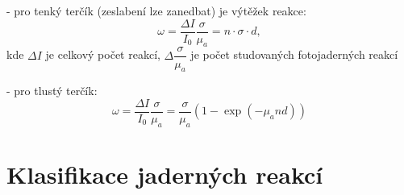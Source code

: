\documentclass[../../main.tex]{subfiles}
\begin{document}
- pro tenký terčík (zeslabení lze zanedbat) je výtěžek reakce:
\begin{equation}
\omega = \dfrac{\Delta I}{I_0} \dfrac{\sigma}{\mu _a} = n \cdotp \sigma \cdotp d,
\end{equation}
kde $\Delta I$ je celkový počet reakcí, $\Delta \dfrac{\sigma}{\mu_a}$ je počet studovaných fotojaderných reakcí

- pro tlustý terčík: 
\begin{equation}
\omega = \dfrac{\Delta I}{I_0} \dfrac{\sigma}{\mu_a} = \dfrac{\sigma}{\mu_a} (1 - \exp(-\mu_a n d))
\end{equation}

\section{Klasifikace jaderných reakcí}
\end{document}
